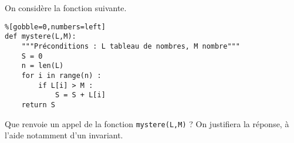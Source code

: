 \exer{}
\setcounter{numques}{0}

On considère la fonction suivante.
\begin{lstlisting}%[gobble=0,numbers=left]
def mystere(L,M):
    """Préconditions : L tableau de nombres, M nombre"""
    S = 0
    n = len(L)
    for i in range(n) : 
        if L[i] > M : 
            S = S + L[i]
    return S
\end{lstlisting}

\bigskip{}

\question{} Que renvoie un appel de la fonction \texttt{mystere(L,M)} ? On justifiera la réponse, à l'aide notamment d'un invariant. 